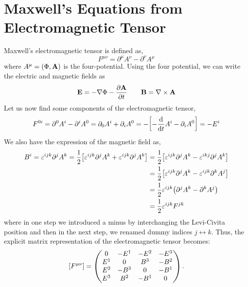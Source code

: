 \section{Maxwell's Equations from Electromagnetic Tensor}\label{sec:appB}
Maxwell's electromagnetic tensor is defined as,
\begin{equation}
    F^{\mu\nu} = \partial^\mu A^\nu - \partial^\nu A^\mu
\end{equation}
where $A^\mu = (\Phi, \vb{A})$ is the four-potential. Using the four potential, we can write the electric and magnetic fields as
$$\vb{E} = -\nabla \Phi -\pdv{\vb{A}}{t}\qquad \vb{B} = \nabla\times \vb{A}$$
Let us now find some components of the electromagnetic tensor,
\begin{align*}
    F^{0i} =  \partial^0 A^i - \partial^i A^0 = \partial_0 A^i +\partial_i A^0 = -\qty[ - \dv{t} A^i - \partial_i A^0] = -E^i\\
\end{align*}
We also have the expression of the magnetic field as, \begin{align*}
    B^i = \varepsilon^{ijk}\partial^j A^k = \frac{1}{2}\qty[\varepsilon^{ijk}\partial^j A^k +\varepsilon^{ijk}\partial^j A^k] &= \frac{1}{2}\qty[\varepsilon^{ijk}\partial^j A^k -\varepsilon^{ikj}\partial^j A^k]\\  &=\frac{1}{2}\qty[\varepsilon^{ijk}\partial^j A^k -\varepsilon^{ijk}\partial^k A^j]\\ &= \frac{1}{2}\varepsilon^{ijk} \qty(\partial^j A^k-\partial^k A^j)\\
    &=\frac{1}{2}\varepsilon^{ijk}F^{jk}
\end{align*}
where in one step we introduced a minus by interchanging the Levi-Civita position and then in the next step, we renamed dummy indices $j \leftrightarrow k$. Thus, the explicit matrix representation of the electromagnetic tensor becomes:
\[
\qty[F^{\mu\nu}] =
\begin{pmatrix}
0 & -E^1 & -E^2 & -E^3 \\
E^1 & 0 & B^3 & -B^2 \\
E^2 & -B^3 & 0 & -B^1 \\
E^3 & B^2 & -B^1 & 0
\end{pmatrix}.
\]